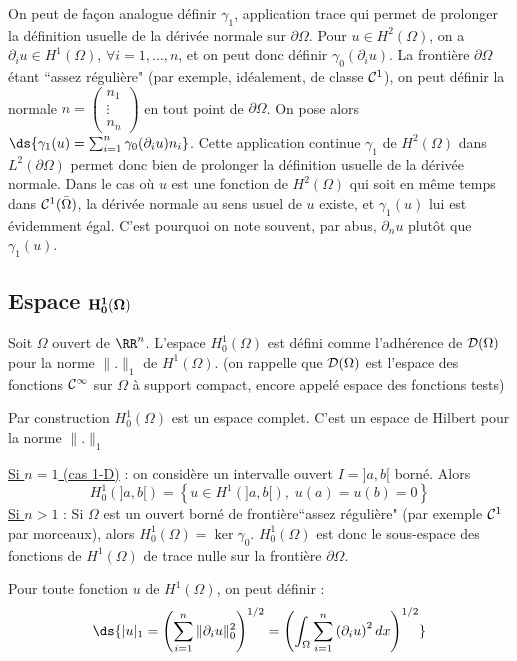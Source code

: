 %
%
On peut de fa\c{c}on analogue d\'efinir $\gamma_1$, application trace qui permet de prolonger la d\'efinition usuelle de la d\'eriv\'ee normale sur $\partial\Omega$.  Pour $u\in H^2(\Omega)$, on a $\partial_i u \in H^1(\Omega)$, $\forall i=1,\ldots,n$, et on peut donc d\'efinir $\gamma_0(\partial_i u)$. La fronti\`ere $\partial\Omega$ \'etant ``assez r\'eguli\`ere" (par exemple, id\'ealement, de classe ${\cal C}^1$), on peut d\'efinir la normale $n=\left(   \begin{array}{l}  n_1 \\ \vdots \\ n_n \end{array} \right)$ en tout point de $\partial\Omega$. On pose alors $\ds{\gamma_1(u) = \sum_{i=1}^n \gamma_0(\partial_i u) n_i}$. Cette application continue $\gamma_1$ de $H^2(\Omega)$ dans $L^2(\partial\Omega)$ permet donc bien de prolonger la d\'efinition usuelle de la d\'eriv\'ee normale. Dans le cas o\`u $u$ est une fonction  de $H^2(\Omega)$ qui soit en m\^eme temps dans  ${\cal C}^1(\bar{\Omega})$, la d\'eriv\'ee normale au sens usuel de $u$ existe, et $\gamma_1(u)$ lui est \'evidemment  \'egal. C'est pourquoi on note souvent, par abus, $\partial_n u$ plut\^ot que $\gamma_1(u)$.
%
%
\subsection{Espace $\bf H^1_0(\Omega)$}
\label{sec:H10}
%
%
\noindent
\begin{definition}
  Soit $\Omega$ ouvert de $\RR^n$. L'espace $H^1_0(\Omega)$ est d\'efini comme
  l'adh\'erence de ${\cal D}(\Omega)$ pour la norme $\|.\|_1$ de
  $H^1(\Omega)$. (on rappelle que ${\cal D}(\Omega)$ est l'espace des
  fonctions ${\cal C}^\infty$ sur $\Omega$ \`a support compact, encore
  appel\'e espace des fonctions tests)\label{def:16}
\end{definition}

%
\begin{theorem}
  Par construction $H^1_0(\Omega)$ est un espace complet. C'est un espace de
  Hilbert pour la norme $\|.\|_1$\label{thr:10}
\end{theorem}

%
\underline{Si $n=1$ (cas 1-D)} : on consid\`ere un intervalle ouvert $I=]a,b[$ born\'e. Alors $$H^1_0(]a,b[) = \left\{ u \in H^1(]a,b[),\; u(a)=u(b)=0 \right\}$$
%
\underline{Si $n>1$} :  Si $\Omega$ est un ouvert born\'e de fronti\`ere``assez r\'eguli\`ere" (par exemple ${\cal C}^1$ par morceaux), alors  $H^1_0(\Omega) = \ker \gamma_0$.
%
$H^1_0(\Omega)$ est donc le sous-espace des fonctions de  $H^1(\Omega)$ de trace nulle sur la fronti\`ere $\partial\Omega$.
%
\begin{definition}
  Pour toute fonction $u$ de $H^1(\Omega)$, on peut d\'efinir :
$$\ds{ |u|_1 = \left( \sum_{i=1}^n \| \partial_i u \|_0^2 \right)^{1/2}
= \left( \int_\Omega \sum_{i=1}^n \left( \partial_i u \right)^2 dx
\right)^{1/2} } \vspace*{5 mm}
$$\label{def:17}
\end{definition}

